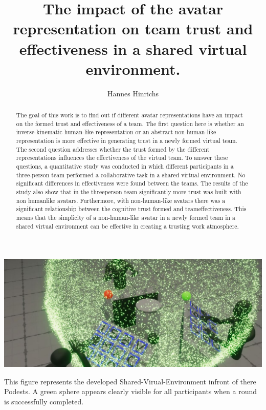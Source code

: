 \documentclass[sigchi]{acmart}
\begin{document}
\title{The impact of the avatar representation on team trust and effectiveness in a shared virtual environment.}

\author{Hannes Hinrichs}

\begin{abstract}
The goal of this work is to find out if different avatar representations have an impact on the formed trust and effectiveness of a team. The first question here is whether an inverse-kinematic human-like representation or an abstract non-human-like representation is more effective in generating trust in a newly formed virtual team. The second question addresses whether the trust formed by the different representations influences the effectiveness of the virtual team. To answer these questions, a quantitative study was conducted in which different participants in a three-person team performed a collaborative task in a shared virtual environment. No significant differences in effectiveness were found between the teams. The results of the study also show that in the threeperson team significantly more trust was built with non humanlike avatars. Furthermore, with non-human-like avatars there was a significant relationship between the cognitive trust formed and teameffectiveness. This means that the simplicity of a non-human-like avatar in a newly formed team in a shared virtual environment can be effective in creating a trusting work atmosphere.
\end{abstract}


\begin{teaserfigure}
  \includegraphics[width=\textwidth]{Abbildungen/RoundSuccsessful2}
  \caption{This figure represents the developed Shared-Virual-Environment infront of there Podests. A green sphere appears clearly visible for all participants when a round is successfully completed.}
  \label{fig:teaser}
\end{teaserfigure}
\end{document}
